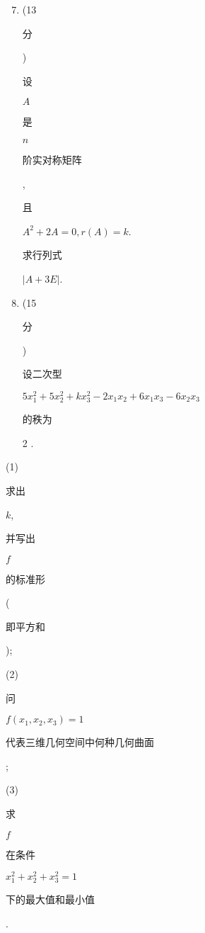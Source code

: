 \documentclass[10pt]{article}
\begin{document}
\begin{enumerate}
  \setcounter{enumi}{6}
  \item (13 \begin{CJK}{UTF8}{mj}分\end{CJK}) \begin{CJK}{UTF8}{mj}设\end{CJK} $A$ \begin{CJK}{UTF8}{mj}是\end{CJK} $n$ \begin{CJK}{UTF8}{mj}阶实对称矩阵\end{CJK}, \begin{CJK}{UTF8}{mj}且\end{CJK} $A^{2}+2 A=0, r(A)=k$. \begin{CJK}{UTF8}{mj}求行列式\end{CJK} $|A+3 E|$.

  \item (15 \begin{CJK}{UTF8}{mj}分\end{CJK}) \begin{CJK}{UTF8}{mj}设二次型\end{CJK} $5 x_{1}^{2}+5 x_{2}^{2}+k x_{3}^{2}-2 x_{1} x_{2}+6 x_{1} x_{3}-6 x_{2} x_{3}$ \begin{CJK}{UTF8}{mj}的秩为\end{CJK} 2 .

\end{enumerate}
(1) \begin{CJK}{UTF8}{mj}求出\end{CJK} $k$, \begin{CJK}{UTF8}{mj}并写出\end{CJK} $f$ \begin{CJK}{UTF8}{mj}的标准形\end{CJK} (\begin{CJK}{UTF8}{mj}即平方和\end{CJK});

(2) \begin{CJK}{UTF8}{mj}问\end{CJK} $f\left(x_{1}, x_{2}, x_{3}\right)=1$ \begin{CJK}{UTF8}{mj}代表三维几何空间中何种几何曲面\end{CJK};

(3) \begin{CJK}{UTF8}{mj}求\end{CJK} $f$ \begin{CJK}{UTF8}{mj}在条件\end{CJK} $x_{1}^{2}+x_{2}^{2}+x_{3}^{2}=1$ \begin{CJK}{UTF8}{mj}下的最大值和最小值\end{CJK}.
\end{document}
